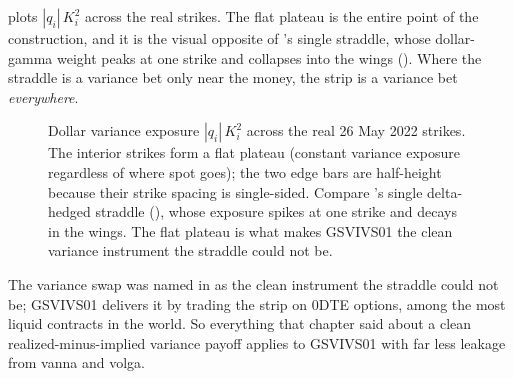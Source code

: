  plots $|q_i|\,K_i^2$ across the real strikes. The flat plateau is the entire point of the construction, and it is the visual opposite of 's single straddle, whose dollar-gamma weight peaks at one strike and collapses into the wings (). Where the straddle is a variance bet only near the money, the strip is a variance bet \emph{everywhere}.

\begin{figure}[ht]
\centering
{}
\caption{Dollar variance exposure $|q_i|\,K_i^2$ across the real 26 May 2022 strikes. The interior strikes form a flat plateau (constant variance exposure regardless of where spot goes); the two edge bars are half-height because their strike spacing is single-sided. Compare 's single delta-hedged straddle (), whose exposure spikes at one strike and decays in the wings. The flat plateau is what makes GSVIVS01 the clean variance instrument the straddle could not be.}
\label{fig:gsvivs:flatgamma}
\end{figure}

\begin{keyidea}
The variance swap was named in  as the clean instrument the straddle could not be; GSVIVS01 delivers it by trading the strip on 0DTE options, among the most liquid contracts in the world. So everything that chapter said about a clean realized-minus-implied variance payoff applies to GSVIVS01 with far less leakage from vanna and volga.
\end{keyidea}

